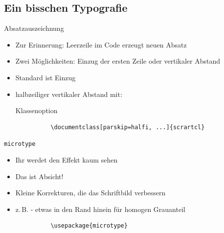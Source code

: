 \subsection{Ein bisschen Typografie}
\begin{frame}[fragile]{Absatzauszeichnung}
  \begin{itemize}
    \item Zur Erinnerung: Leerzeile im Code erzeugt neuen Absatz
    \item Zwei Möglichkeiten: Einzug der ersten Zeile oder vertikaler Abstand
    \item Standard ist Einzug
    \item halbzeiliger vertikaler Abstand mit:
      \begin{block}{Klassenoption}
        \begin{lstlisting}
          \documentclass[parskip=halfi, ...]{scrartcl}
        \end{lstlisting}
      \end{block}
  \end{itemize}
\end{frame}

\begin{frame}[fragile]{\texttt{microtype}}
  \begin{itemize}
    \item Ihr werdet den Effekt kaum sehen
    \item Das ist Absicht!
    \item Kleine Korrekturen, die das Schriftbild verbessern
    \item z.\,B. - etwas in den Rand hinein für homogen Grauanteil
      \begin{Packages}
        \begin{lstlisting}
          \usepackage{microtype}
        \end{lstlisting}
      \end{Packages}
  \end{itemize}
\end{frame}

